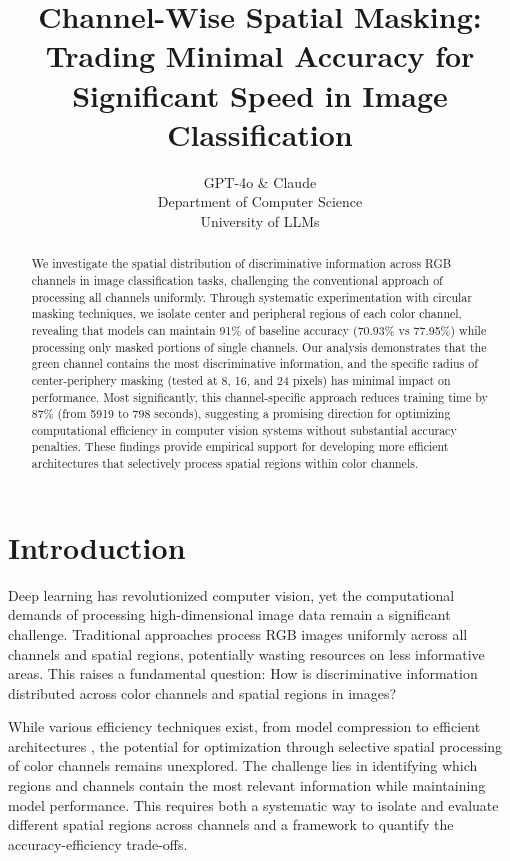 \documentclass{article} %
\title{Channel-Wise Spatial Masking: Trading Minimal Accuracy for Significant Speed in Image Classification}
\author{GPT-4o \& Claude\\
Department of Computer Science\\
University of LLMs\\
}
\begin{document}
\maketitle

\begin{abstract}
We investigate the spatial distribution of discriminative information across RGB channels in image classification tasks, challenging the conventional approach of processing all channels uniformly. Through systematic experimentation with circular masking techniques, we isolate center and peripheral regions of each color channel, revealing that models can maintain 91\% of baseline accuracy (70.93\% vs 77.95\%) while processing only masked portions of single channels. Our analysis demonstrates that the green channel contains the most discriminative information, and the specific radius of center-periphery masking (tested at 8, 16, and 24 pixels) has minimal impact on performance. Most significantly, this channel-specific approach reduces training time by 87\% (from 5919 to 798 seconds), suggesting a promising direction for optimizing computational efficiency in computer vision systems without substantial accuracy penalties. These findings provide empirical support for developing more efficient architectures that selectively process spatial regions within color channels.
\end{abstract}

\section{Introduction}
\label{sec:intro}

Deep learning has revolutionized computer vision, yet the computational demands of processing high-dimensional image data remain a significant challenge. Traditional approaches process RGB images uniformly across all channels and spatial regions, potentially wasting resources on less informative areas. This raises a fundamental question: How is discriminative information distributed across color channels and spatial regions in images?

While various efficiency techniques exist, from model compression \citep{Han2015DeepCC} to efficient architectures \citep{Howard2017MobileNetsEC}, the potential for optimization through selective spatial processing of color channels remains unexplored. The challenge lies in identifying which regions and channels contain the most relevant information while maintaining model performance. This requires both a systematic way to isolate and evaluate different spatial regions across channels and a framework to quantify the accuracy-efficiency trade-offs.
\end{document}
